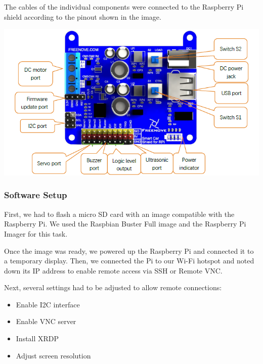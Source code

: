     \noindent
    \begin{minipage}[t]{0.63\textwidth}
        \vspace*{0pt}
        The cables of the individual components were connected to the Raspberry Pi shield according to the pinout shown in the image.
    \end{minipage}
    \hfill
    \begin{minipage}[t]{0.33\textwidth}
        \vspace*{0pt}
        \includegraphics[width=\linewidth]{img/shield_pinout}
    \end{minipage}

    \vspace{2em}


    \subsubsection{Software Setup}

    First, we had to flash a micro SD card with an image compatible with the Raspberry Pi. We used the Raspbian Buster Full image and the Raspberry Pi Imager for this task.

    Once the image was ready, we powered up the Raspberry Pi and connected it to a temporary display. Then, we connected the Pi to our Wi-Fi hotspot and noted down its IP address to enable remote access via SSH or Remote VNC.

    Next, several settings had to be adjusted to allow remote connections:
    \begin{itemize}
        \item Enable I2C interface
        \item Enable VNC server
        \item Install XRDP
        \item Adjust screen resolution
    \end{itemize}

